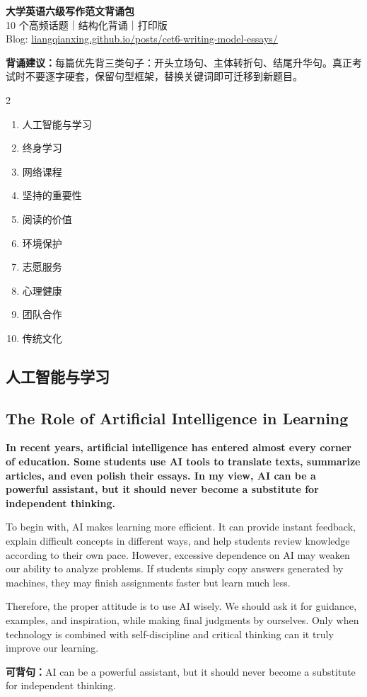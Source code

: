 ﻿\documentclass[UTF8,zihao=-4]{ctexart}
\newenvironment{essayblock}{\Needspace{0.46\textheight}\begin{samepage}}{\end{samepage}\vspace{0.2em}}
\newcommand{\essay}[3]{\section{#1}\subsection{#2}\textbf{#3}\par}
\newcommand{\keysentence}[1]{\begin{sentbox}\textbf{可背句：}#1\end{sentbox}}
\begin{document}
\begin{center}
{\Huge \bfseries 大学英语六级写作范文背诵包}\\[0.35em]
{\large 10 个高频话题｜结构化背诵｜打印版}\\[0.3em]
{\small Blog: \href{https://liangqianxing.github.io/posts/cet6-writing-model-essays/}{liangqianxing.github.io/posts/cet6-writing-model-essays/}}
\end{center}

\begin{tipbox}
\textbf{背诵建议：}每篇优先背三类句子：开头立场句、主体转折句、结尾升华句。真正考试时不要逐字硬套，保留句型框架，替换关键词即可迁移到新题目。
\end{tipbox}

\begin{multicols}{2}
\begin{enumerate}
  \item 人工智能与学习
  \item 终身学习
  \item 网络课程
  \item 坚持的重要性
  \item 阅读的价值
  \item 环境保护
  \item 志愿服务
  \item 心理健康
  \item 团队合作
  \item 传统文化
\end{enumerate}
\end{multicols}

\begin{essayblock}
\essay{人工智能与学习}{The Role of Artificial Intelligence in Learning}{In recent years, artificial intelligence has entered almost every corner of education. Some students use AI tools to translate texts, summarize articles, and even polish their essays. In my view, AI can be a powerful assistant, but it should never become a substitute for independent thinking.}

To begin with, AI makes learning more efficient. It can provide instant feedback, explain difficult concepts in different ways, and help students review knowledge according to their own pace. However, excessive dependence on AI may weaken our ability to analyze problems. If students simply copy answers generated by machines, they may finish assignments faster but learn much less.

Therefore, the proper attitude is to use AI wisely. We should ask it for guidance, examples, and inspiration, while making final judgments by ourselves. Only when technology is combined with self-discipline and critical thinking can it truly improve our learning.

\keysentence{AI can be a powerful assistant, but it should never become a substitute for independent thinking.}
\end{essayblock}
\end{document}
